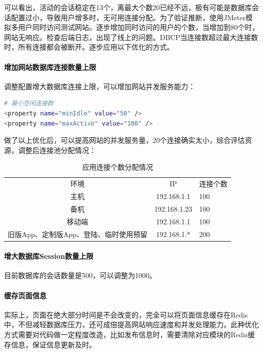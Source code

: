 \documentclass{book}
\begin{document}
可以看出，活动的会话稳定在13个，离最大个数20已经不远，极有可能是数据库会话配置过小，导致用户增多时，无可用连接分配。为了验证推断，使用JMeter模拟多用户同时访问测试网站。逐步增加同时访问的用户的个数，当增加到80个时，网站无响应。检查后端日志，出现了线上的问题。DBCP当连接数超过最大连接数时，所有连接都会被断开。逐步应用以下优化的方式。

\paragraph{增加网站数据库连接数量上限}调整配置增大数据库连接上限，可以增加网站并发服务能力：

\begin{lstlisting}[language=Bash]
# 最小空闲连接数
<property name="minIdle" value="50" />
<property name="maxActive" value="100" />
\end{lstlisting}

做了以上优化后，可以提高网站的并发服务量，20个连接确实太小，综合评估资源，调整后连接池分配情况：

\begin{table}[htbp]
	\caption{应用连接个数分配情况}
	\label{table:projectdirectionayinfo}
	\begin{center}
		\begin{tabular}{|c|c|p{2cm}|}
			\hline
			\multirow{1}{*}{环境}
			& \multicolumn{1}{c|}{IP} 
			& \multicolumn{1}{c|}{连接个数}\\			
			\cline{1-3}
			主机 &  192.168.1.1  & 100 \\
			\hline
			备机 &  192.168.1.23  & 100 \\
			\hline
			移动端 &  192.168.1.1  & 100 \\
			\hline
			旧版App、定制版App、登陆、临时使用预留 &  192.168.1.*  & 200 \\
			\hline									
		\end{tabular}	
	\end{center}
\end{table}

\paragraph{增大数据库Session数量上限}目前数据库的会话数量是500，可以调整为1000。

\paragraph{缓存页面信息}实际上，页面在绝大部分时间是不会改变的，完全可以将页面信息缓存在Redis中，不但减轻数据库压力，还可成倍提高网站响应速度和并发处理能力。此种优化方式需要对代码做一定程度改造，比如发布信息时，需要清除对应模块的Redis缓存信息，保证信息更新及时。
\end{document}
